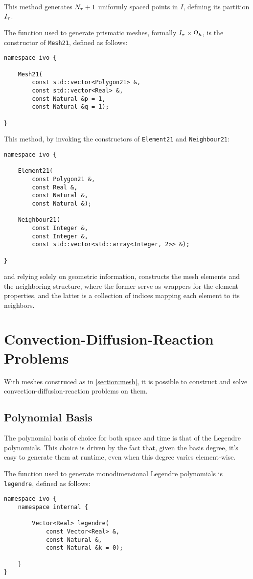 This method generates $N_{\tau} + 1$ uniformly spaced points in $I$, defining its partition $I_{\tau}$.

The function used to generate prismatic meshes, formally $I_{\tau} \times \Omega_{h}$, is the constructor of \lstinline{Mesh21}, defined as follows:
\begin{lstlisting}[style=cpp]
namespace ivo {

    Mesh21(
        const std::vector<Polygon21> &, 
        const std::vector<Real> &, 
        const Natural &p = 1, 
        const Natural &q = 1);

}
\end{lstlisting}

This method, by invoking the constructors of \lstinline{Element21} and \lstinline{Neighbour21}:
\begin{lstlisting}[style=cpp]
namespace ivo {

    Element21(
        const Polygon21 &, 
        const Real &, 
        const Natural &, 
        const Natural &);

    Neighbour21(
        const Integer &, 
        const Integer &, 
        const std::vector<std::array<Integer, 2>> &);

}
\end{lstlisting}
and relying solely on geometric information, constructs the mesh elements and the neighboring structure, where the former serve as wrappers for the element properties, and the latter is a collection of indices mapping each element to its neighbors.

\newpage
\section{Convection-Diffusion-Reaction Problems}

With meshes construced as in \cref{section:mesh}, it is possible to construct and solve convection-diffusion-reaction problems on them.

\subsection{Polynomial Basis}

The polynomial basis of choice for both space and time is that of the Legendre polynomials. This choice is driven by the fact that, given the basis degree, it's easy to generate them at runtime, even when this degree varies element-wise.

The function used to generate monodimensional Legendre polynomials is \lstinline{legendre}, defined as follows:
\begin{lstlisting}[style=cpp]
namespace ivo {
    namespace internal {

        Vector<Real> legendre(
            const Vector<Real> &, 
            const Natural &, 
            const Natural &k = 0);

    }
}
\end{lstlisting}

